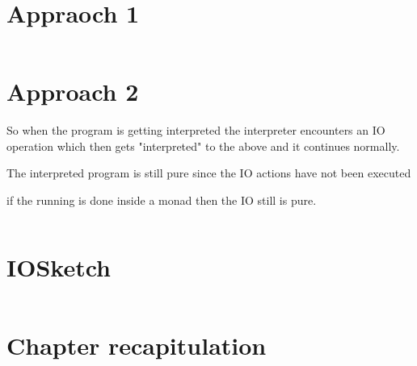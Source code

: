 \documentclass[thesis-solanki.tex]{subfiles}
\begin{document}
\section{Appraoch 1}

\begin{code-list}[H]

\begin{singlespace}
  \inputminted[linenos]{haskell}{haskell-proto4-myrtle-uppers.hs}
\end{singlespace}

\caption{}
\label{}
\end{code-list}


\section{Approach 2}

So when the program is getting interpreted the interpreter encounters an IO operation which then gets "interpreted" to the above and it 
continues normally.

The interpreted program is still pure since the IO actions have not been executed 

if the running is done inside a monad then the IO still is pure.


\begin{code-list}[H]
\begin{singlespace}

  \inputminted[linenos]{haskell}{haskell-proto4-platen-winkel.hs}
\end{singlespace}
\caption{}
\label{}
\end{code-list}


\section{IOSketch}

\begin{code-list}[H]
\begin{singlespace}
\inputminted[linenos]{haskell}{IOSketch.hs}
\end{singlespace}
\caption{}
\label{}
\end{code-list}


\section{Chapter recapitulation}

\ifMain
\begin{scope}
  \nolinenumbers
  \enotesize
  \par
  \begin{singlespace}
  \setlength{\parskip}{12pt plus 2pt minus 1pt}
  \theendnotes
  \par
  \end{singlespace}
\end{scope}
\fi
\end{document}
